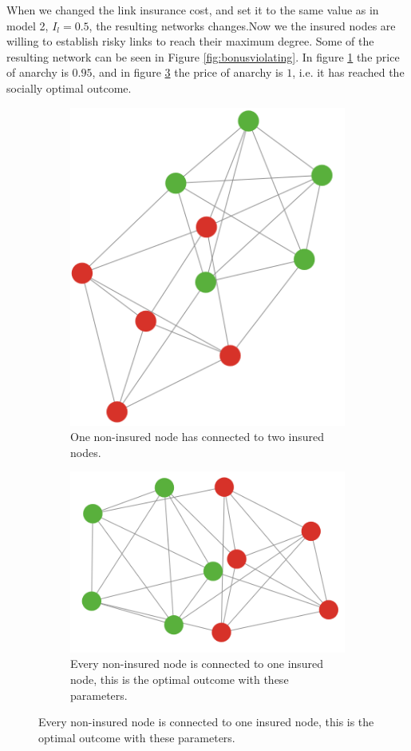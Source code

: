 When we changed the link insurance cost, and set it to the same value as in model 2, $I_{l}=0.5$, the resulting networks changes.Now we the insured nodes are willing to establish risky links to reach their maximum degree. Some of the resulting network can be seen in Figure \ref{fig:bonusviolating}.
In figure \ref{fig:bonusvolating:a} the price of anarchy is $0.95$, and in figure \ref{fig:bonusvolating:b} the price of anarchy is $1$, i.e. it has reached the socially optimal outcome.
\begin{figure}[t]
\centering
\begin{subfigure}{.5\textwidth}
  \centering
  \includegraphics[width=0.9\linewidth]{../Figures/BonusGameViolating.png}
  \caption{\label{fig:bonusvolating:a} One non-insured node has connected to two insured nodes.}
\end{subfigure}
\quad
\begin{subfigure}{.5\textwidth}
  \centering
  \includegraphics[width=0.9\linewidth]{../Figures/BonusGameViolatingOptimal.png}
  \caption{\label{fig:bonusvolating:b}Every non-insured node is connected to one insured node, this is the optimal outcome with these parameters.}
\end{subfigure}
  

\end{figure}

